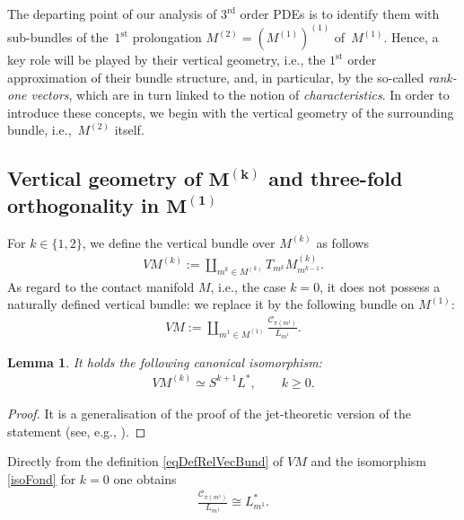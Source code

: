 \documentclass[pdftex]{sigma}
\newcommand{\C}{\mathcal{C}}
\newcommand{\St}{^\textrm{st}}
\newcommand{\Rd}{^\textrm{rd}}
\numberwithin{equation}{section}
\newtheorem{Lemma}[Theorem]{Lemma}
\begin{document}
The departing point of our analysis of $3\Rd$ order PDEs is to identify them with sub-bundles of the~$1\St$ prolongation $M^{(2)}=(M^{(1)})^{(1)}$ of~$M^{(1)}$. Hence, a key role will be played by their vertical geometry, i.e., the $1\St$ order approximation of their bundle structure, and, in particular, by the so-called \emph{rank-one vectors}, which are in turn linked to the notion of \emph{characteristics}. In order to introduce these concepts, we begin with the vertical geometry of the surrounding bundle, i.e.,~$M^{(2)}$ itself.

\subsection[Vertical geometry of $M^{(k)}$ and three-fold orthogonality in $M^{(1)}$]{Vertical geometry of $\boldsymbol{M^{(k)}}$ and three-fold orthogonality in $\boldsymbol{M^{(1)}}$}

 For $k\in\{1,2\}$,
we def\/ine the vertical bundle over $M^{(k)}$ as follows
\begin{gather*}
VM^{(k)}:=\coprod_{m^k\in M^{(k)}}T_{m^k}M^{(k)}_{m^{k-1}}.
\end{gather*}
As regard to the contact manifold $M$, i.e., the case $k=0$, it does not possess a naturally def\/ined vertical bundle: we replace it by the following bundle on $M^{(1)}$:
\begin{gather}\label{eqDefRelVecBund}
VM:=\coprod_{m^1\in M^{(1)}}\frac{\C_{\pi (m^1)}}{L_{m^1}}.
\end{gather}

\begin{Lemma}\label{lemFund}
It holds the following canonical isomorphism:
 \begin{gather}\label{isoFond}
VM^{(k)}\simeq S^{k+1}L^*, \qquad k\geq 0.
\end{gather}
\end{Lemma}
\begin{proof}
It is a generalisation of the proof of the jet-theoretic version of the statement (see, e.g., \cite[Theo\-rem~3.2]{ThesisMichi}).
\end{proof}

Directly from the def\/inition \eqref{eqDefRelVecBund} of $VM$ and the isomorphism \eqref{isoFond} for $k=0$ one obtains
\begin{gather}\label{eq1ellstar}
 \frac{\C_{\pi (m^1)}}{L_{m^1}}\cong L_{m^1}^\ast.
\end{gather}
\end{document}
